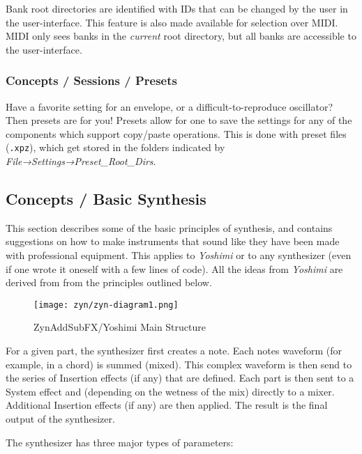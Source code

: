    Bank root directories are identified with IDs that can be changed by the
   user in the user-interface. This feature is also made available for
   selection over MIDI.  MIDI only sees banks in the \textsl{current} root
   directory, but all banks are accessible to the user-interface.

\subsubsection{Concepts / Sessions / Presets}
\label{subsec:concepts_sessions_presets}

   Have a favorite setting for an envelope, or a difficult-to-reproduce
   oscillator? Then presets are for you! Presets allow for one to save the
   settings for any of the components which support copy/paste operations.
   This is done with preset files (\texttt{.xpz}), which get stored in the
   folders indicated by \textsl{File→Settings→Preset\_Root\_Dirs}.

\subsection{Concepts / Basic Synthesis}
\label{subsec:concepts_basics}

   This section describes some of the basic principles of synthesis,
   and contains suggestions on
   how to make instruments that sound like they have been made with
   professional equipment. This applies to \textsl{Yoshimi} or to any
   synthesizer (even if one wrote it oneself with a few lines of code). All
   the ideas from \textsl{Yoshimi} are derived from from the principles
   outlined below.

\begin{figure}[H]
   \centering 
   \texttt{[image: zyn/zyn-diagram1.png]}
   \caption{ZynAddSubFX/Yoshimi Main Structure}
   \label{fig:zynaddsubfx_main_structure}
\end{figure}

   For a given part, the synthesizer first creates a note.  Each notes
   waveform (for example, in a chord) is summed (mixed).  This complex
   waveform is then send to the series of Insertion effects (if any) that
   are defined.  Each part is then sent to a System effect and (depending on
   the wetness of the mix) directly to a mixer.  Additional Insertion
   effects (if any) are then applied.  The result is the final output of the
   synthesizer.

   The synthesizer has three major types of parameters: 


